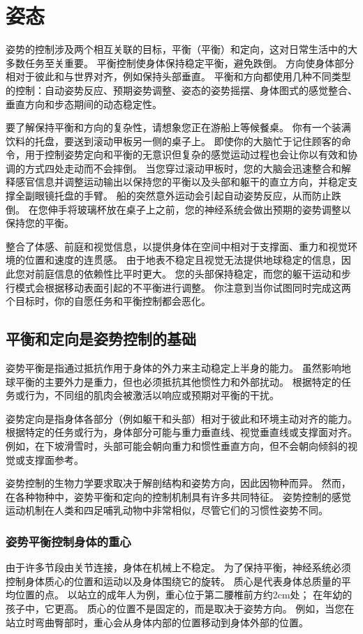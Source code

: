 \chapter{姿态} \label{chap:chap36}
姿势的控制涉及两个相互关联的目标，平衡（平衡）和定向，这对日常生活中的大多数任务至关重要。 平衡控制使身体保持稳定平衡，避免跌倒。 方向使身体部分相对于彼此和与世界对齐，例如保持头部垂直。 平衡和方向都使用几种不同类型的控制：自动姿势反应、预期姿势调整、姿态的姿势摇摆、身体图式的感觉整合、垂直方向和步态期间的动态稳定性。

要了解保持平衡和方向的复杂性，请想象您正在游船上等候餐桌。 你有一个装满饮料的托盘，要送到滚动甲板另一侧的桌子上。 即使你的大脑忙于记住顾客的命令，用于控制姿势定向和平衡的无意识但复杂的感觉运动过程也会让你以有效和协调的方式四处走动而不会摔倒。 当您穿过滚动甲板时，您的大脑会迅速整合和解释感官信息并调整运动输出以保持您的平衡以及头部和躯干的直立方向，并稳定支撑全副眼镜托盘的手臂。 船的突然意外运动会引起自动姿势反应，从而防止跌倒。 在您伸手将玻璃杯放在桌子上之前，您的神经系统会做出预期的姿势调整以保持您的平衡。

整合了体感、前庭和视觉信息，以提供身体在空间中相对于支撑面、重力和视觉环境的位置和速度的连贯感。 由于地表不稳定且视觉无法提供地球稳定的信息，因此您对前庭信息的依赖性比平时更大。 您的头部保持稳定，而您的躯干运动和步行模式会根据移动表面引起的不平衡进行调整。 你注意到当你试图同时完成这两个目标时，你的自愿任务和平衡控制都会恶化。

\section{平衡和定向是姿势控制的基础}
姿势平衡是指通过抵抗作用于身体的外力来主动稳定上半身的能力。 虽然影响地球平衡的主要外力是重力，但也必须抵抗其他惯性力和外部扰动。 根据特定的任务或行为，不同组的肌肉会被激活以响应或预期对平衡的干扰。

姿势定向是指身体各部分（例如躯干和头部）相对于彼此和环境主动对齐的能力。 根据特定的任务或行为，身体部分可能与重力垂直线、视觉垂直线或支撑面对齐。 例如，在下坡滑雪时，头部可能会朝向重力和惯性垂直方向，但不会朝向倾斜的视觉或支撑面参考。

姿势控制的生物力学要求取决于解剖结构和姿势方向，因此因物种而异。 然而，在各种物种中，姿势平衡和定向的控制机制具有许多共同特征。 姿势控制的感觉运动机制在人类和四足哺乳动物中非常相似，尽管它们的习惯性姿势不同。


\subsection{姿势平衡控制身体的重心}
由于许多节段由关节连接，身体在机械上不稳定。 为了保持平衡，神经系统必须控制身体质心的位置和运动以及身体围绕它的旋转。 质心是代表身体总质量的平均位置的点。 以站立的成年人为例，重心位于第二腰椎前方约2cm处； 在年幼的孩子中，它更高。 质心的位置不是固定的，而是取决于姿势方向。 例如，当您在站立时弯曲臀部时，重心会从身体内部的位置移动到身体外部的位置。

